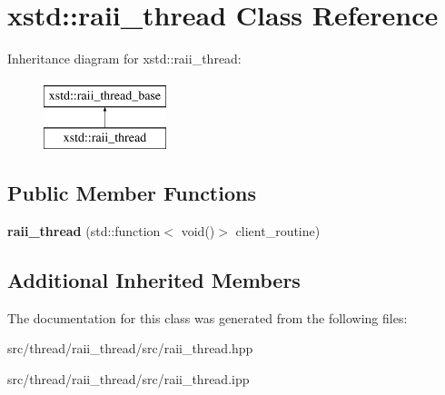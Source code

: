 \hypertarget{classxstd_1_1raii__thread}{\section{xstd\-:\-:raii\-\_\-thread Class Reference}
\label{classxstd_1_1raii__thread}
}
Inheritance diagram for xstd\-:\-:raii\-\_\-thread\-:\begin{figure}[H]
\begin{center}
\leavevmode
\includegraphics[height=2.000000cm]{classxstd_1_1raii__thread}
\end{center}
\end{figure}
\subsection*{Public Member Functions}
\begin{DoxyCompactItemize}
\item 
\hypertarget{classxstd_1_1raii__thread_a8bc39a85a55f9becb860febe87f9175c}{{\bfseries raii\-\_\-thread} (std\-::function$<$ void()$>$ client\-\_\-routine)}\label{classxstd_1_1raii__thread_a8bc39a85a55f9becb860febe87f9175c}

\end{DoxyCompactItemize}
\subsection*{Additional Inherited Members}


The documentation for this class was generated from the following files\-:\begin{DoxyCompactItemize}
\item 
src/thread/raii\-\_\-thread/src/raii\-\_\-thread.\-hpp\item 
src/thread/raii\-\_\-thread/src/raii\-\_\-thread.\-ipp\end{DoxyCompactItemize}
